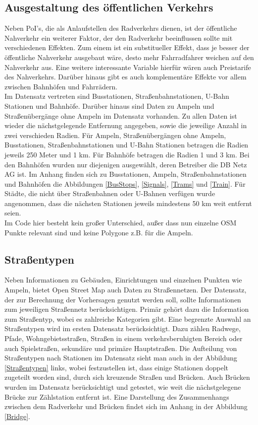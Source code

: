 \documentclass[a4paper,12pt]{thesis}
\begin{document}
\subsection{Ausgestaltung des öffentlichen Verkehrs}

Neben PoI's, die als Anlaufstellen des Radverkehrs dienen, ist der öffentliche Nahverkehr ein weiterer Faktor, der den Radverkehr beeinflussen sollte mit verschiedenen Effekten. Zum einem ist ein substitueller Effekt, dass je besser der öffentliche Nahverkehr ausgebaut wäre, desto mehr Fahrradfahrer weichen auf den Nahverkehr aus. Eine weitere interessante Variable hierfür wären auch Preistarife des Nahverkehrs. Darüber hinaus gibt es auch komplementäre Effekte vor allem zwischen Bahnhöfen und Fahrrädern.\\
Im Datensatz vertreten sind Busstationen, Straßenbahnstationen, U-Bahn Stationen und Bahnhöfe. Darüber hinaus sind Daten zu Ampeln und Straßenübergänge ohne Ampeln im Datensatz vorhanden. Zu allen Daten ist wieder die nächstgelegende Entfernung angegeben, sowie die jeweilige Anzahl in zwei verschieden Radien. Für Ampeln, Straßenübergängen ohne Ampeln, Busstationen, Straßenbahnstationen und U-Bahn Stationen betragen die Radien jeweils 250 Meter und 1 km. Für Bahnhöfe betragen die Radien 1 und 3 km. Bei den Bahnhöfen wurden nur diejenigen ausgewählt, deren Betreiber die DB Netz AG ist. Im Anhang finden sich zu Busstationen, Ampeln, Straßenbahnstationen und Bahnhöfen die Abbildungen \ref{BusStops}, \ref{Signals}, \ref{Trams} und \ref{Train}. Für Städte, die nicht über Straßenbahnen oder U-Bahnen verfügen wurde angenommen, dass die nächsten Stationen jeweils mindestens 50 km weit entfernt seien.\\
Im Code hier besteht kein großer Unterschied, außer dass nun einzelne OSM Punkte relevant sind und keine Polygone z.B. für die Ampeln.

\subsection{Straßentypen}

Neben Informationen zu Gebäuden, Einrichtungen und einzelnen Punkten wie Ampeln, bietet Open Street Map auch Daten zu Straßennetzen. Der Datensatz, der zur Berechnung der Vorhersagen genutzt werden soll, sollte Informationen zum jeweiligen Straßennetz berücksichtigen. Primär gehört dazu die Information zum Straßentyp, wobei es zahlreiche Kategorien gibt. Eine begrenzte Auswahl an Straßentypen wird im ersten Datensatz berücksichtigt. Dazu zählen Radwege, Pfade, Wohngebietsstraßen, Straßen in einem verkehrsberuhigten Bereich oder auch Spielstraßen, sekundäre und primäre Hauptstraßen. Die Aufteilung von Straßentypen nach Stationen im Datensatz sieht man auch in der Abbildung \ref{Straßentypen} links, wobei festzustellen ist, dass einige Stationen doppelt zugeteilt worden sind, durch sich kreuzende Straßen und Brücken. Auch Brücken wurden im Datensatz berücksichtigt und getestet, wie weit die nächstgelegene Brücke zur Zählstation entfernt ist. Eine Darstellung des Zusammenhangs zwischen dem Radverkehr und Brücken findet sich im Anhang in der Abbildung \ref{Bridge}.\\
\end{document}
